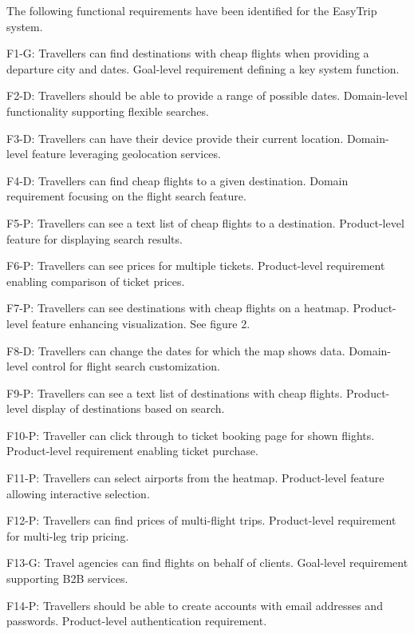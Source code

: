 The following functional requirements have been identified for the EasyTrip system.

F1-G: Travellers can find destinations with cheap flights when providing a departure city and dates.
    Goal-level requirement defining a key system function.
    
F2-D: Travellers should be able to provide a range of possible dates.
    Domain-level functionality supporting flexible searches.
    
F3-D: Travellers can have their device provide their current location.
    Domain-level feature leveraging geolocation services.
    
F4-D: Travellers can find cheap flights to a given destination.
    Domain requirement focusing on the flight search feature.
    
F5-P: Travellers can see a text list of cheap flights to a destination.
    Product-level feature for displaying search results.
    
F6-P: Travellers can see prices for multiple tickets.
    Product-level requirement enabling comparison of ticket prices.

F7-P: Travellers can see destinations with cheap flights on a heatmap.
    Product-level feature enhancing visualization. See figure 2.

F8-D: Travellers can change the dates for which the map shows data.
    Domain-level control for flight search customization.

F9-P: Travellers can see a text list of destinations with cheap flights.
    Product-level display of destinations based on search.

F10-P: Traveller can click through to ticket booking page for shown flights.
    Product-level requirement enabling ticket purchase.

F11-P: Travellers can select airports from the heatmap.
    Product-level feature allowing interactive selection.

F12-P: Travellers can find prices of multi-flight trips.
    Product-level requirement for multi-leg trip pricing.

F13-G: Travel agencies can find flights on behalf of clients.
    Goal-level requirement supporting B2B services.

F14-P: Travellers should be able to create accounts with email addresses and passwords.
    Product-level authentication requirement.

